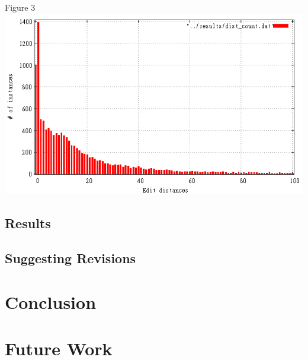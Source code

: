 \documentclass[11pt, oneside]{article}   	%
\begin{document}
\centering
Figure 3
\includegraphics[width=\textwidth]{edit-dist-instances}



\raggedright
\subsection{Results}
\subsection{Suggesting Revisions}

\section{Conclusion}
\section{Future Work}
\end{document}
